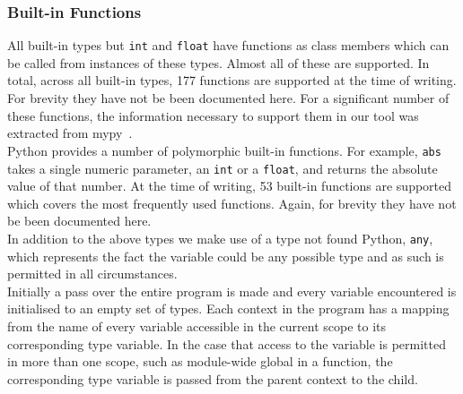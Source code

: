\documentclass[12pt, titlepage]{article}
\begin{document}
\subsubsection{Built-in Functions}
\indent All built-in types but \texttt{int} and \texttt{float} have functions as class members which can be called from instances of these types. Almost all of these are supported. In total, across all built-in types, 177 functions are supported at the time of writing. For brevity they have not be been documented here. For a significant number of these functions, the information necessary to support them in our tool was extracted from mypy~\cite{mypy}. \\
\indent Python provides a number of polymorphic built-in functions. For example, \texttt{abs} takes a single numeric parameter, an \texttt{int} or a \texttt{float}, and returns the absolute value of that number. At the time of writing, 53 built-in functions are supported which covers the most frequently used functions. Again, for brevity they have not be been documented here. \\
\indent In addition to the above types we make use of a type not found Python, \texttt{any}, which represents the fact the variable could be any possible type and as such is permitted in all circumstances. \\
\indent Initially a pass over the entire program is made and every variable encountered is initialised to an empty set of types. Each context in the program has a mapping from the name of every variable accessible in the current scope to its corresponding type variable. In the case that access to the variable is permitted in more than one scope, such as module-wide global in a function, the corresponding type variable is passed from the parent context to the child.
\end{document}
